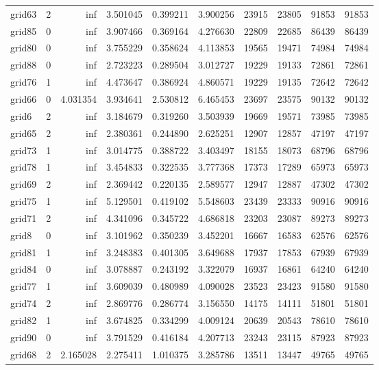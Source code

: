 \begin{longtable}{|l|r|r|r|r|r|r|r|r|r|}
grid63 & 2 & inf & 3.501045 & 0.399211 & 3.900256 & 23915 & 23805 & 91853 & 91853 \\
grid85 & 0 & inf & 3.907466 & 0.369164 & 4.276630 & 22809 & 22685 & 86439 & 86439 \\
grid80 & 0 & inf & 3.755229 & 0.358624 & 4.113853 & 19565 & 19471 & 74984 & 74984 \\
grid88 & 0 & inf & 2.723223 & 0.289504 & 3.012727 & 19229 & 19133 & 72861 & 72861 \\
grid76 & 1 & inf & 4.473647 & 0.386924 & 4.860571 & 19229 & 19135 & 72642 & 72642 \\
grid66 & 0 & 4.031354 & 3.934641 & 2.530812 & 6.465453 & 23697 & 23575 & 90132 & 90132 \\
grid6 & 2 & inf & 3.184679 & 0.319260 & 3.503939 & 19669 & 19571 & 73985 & 73985 \\
grid65 & 2 & inf & 2.380361 & 0.244890 & 2.625251 & 12907 & 12857 & 47197 & 47197 \\
grid73 & 1 & inf & 3.014775 & 0.388722 & 3.403497 & 18155 & 18073 & 68796 & 68796 \\
grid78 & 1 & inf & 3.454833 & 0.322535 & 3.777368 & 17373 & 17289 & 65973 & 65973 \\
grid69 & 2 & inf & 2.369442 & 0.220135 & 2.589577 & 12947 & 12887 & 47302 & 47302 \\
grid75 & 1 & inf & 5.129501 & 0.419102 & 5.548603 & 23439 & 23333 & 90916 & 90916 \\
grid71 & 2 & inf & 4.341096 & 0.345722 & 4.686818 & 23203 & 23087 & 89273 & 89273 \\
grid8 & 0 & inf & 3.101962 & 0.350239 & 3.452201 & 16667 & 16583 & 62576 & 62576 \\
grid81 & 1 & inf & 3.248383 & 0.401305 & 3.649688 & 17937 & 17853 & 67939 & 67939 \\
grid84 & 0 & inf & 3.078887 & 0.243192 & 3.322079 & 16937 & 16861 & 64240 & 64240 \\
grid77 & 1 & inf & 3.609039 & 0.480989 & 4.090028 & 23523 & 23423 & 91580 & 91580 \\
grid74 & 2 & inf & 2.869776 & 0.286774 & 3.156550 & 14175 & 14111 & 51801 & 51801 \\
grid82 & 1 & inf & 3.674825 & 0.334299 & 4.009124 & 20639 & 20543 & 78610 & 78610 \\
grid90 & 0 & inf & 3.791529 & 0.416184 & 4.207713 & 23243 & 23115 & 87923 & 87923 \\
grid68 & 2 & 2.165028 & 2.275411 & 1.010375 & 3.285786 & 13511 & 13447 & 49765 & 49765 \\

\end{longtable}
